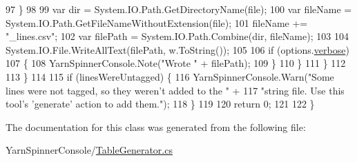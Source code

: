 \begin{DoxyCode}
97                         \}
98 
99                         var dir = System.IO.Path.GetDirectoryName(file);
100                         var fileName = System.IO.Path.GetFileNameWithoutExtension(file);
101                         fileName += \textcolor{stringliteral}{"\_lines.csv"};
102                         var filePath = System.IO.Path.Combine(dir, fileName);
103 
104                         System.IO.File.WriteAllText(filePath, w.ToString());
105 
106                         \textcolor{keywordflow}{if} (options.\hyperlink{a00022_ada4d83d1756918f362d55f6649b82b17}{verbose})
107                         \{
108                             YarnSpinnerConsole.Note(\textcolor{stringliteral}{"Wrote "} + filePath);
109                         \}
110                     \}                   
111                 \}
112 
113             \}
114 
115             \textcolor{keywordflow}{if} (linesWereUntagged) \{
116                 YarnSpinnerConsole.Warn(\textcolor{stringliteral}{"Some lines were not tagged, so they weren't added to the "} +
117                                \textcolor{stringliteral}{"string file. Use this tool's 'generate' action to add them."});
118             \}
119 
120             \textcolor{keywordflow}{return} 0;
121 
122         \}
\end{DoxyCode}


The documentation for this class was generated from the following file\-:\begin{DoxyCompactItemize}
\item 
Yarn\-Spinner\-Console/\hyperlink{a00277}{Table\-Generator.\-cs}\end{DoxyCompactItemize}
